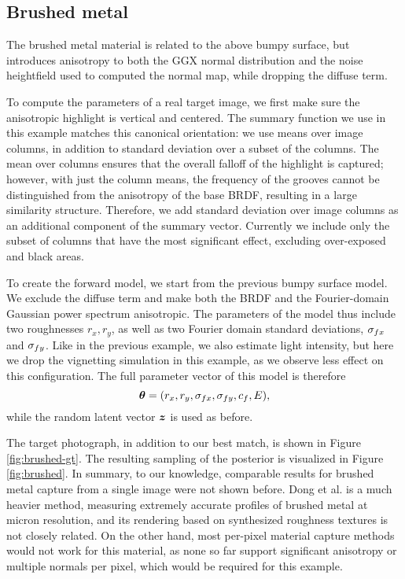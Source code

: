 \subsection{Brushed metal}

The brushed metal material is related to the above bumpy surface, but introduces anisotropy to both the GGX normal distribution and the noise heightfield used to computed the normal map, while dropping the diffuse term. %

To compute the parameters of a real target image, we first make sure the anisotropic highlight is vertical and centered. The summary function we use in this example matches this canonical orientation: we use means over image columns, in addition to standard deviation over a subset of the columns. The mean over columns ensures that the overall falloff of the highlight is captured; however, with just the column means, the frequency of the grooves cannot be distinguished from the anisotropy of the base BRDF, resulting in a large similarity structure. Therefore, we add standard deviation over image columns as an additional component of the summary vector. Currently we include only the subset of columns that have the most significant effect, excluding over-exposed and black areas.

To create the forward model, we start from the previous bumpy surface model. We exclude the diffuse term and make both the BRDF and the Fourier-domain Gaussian power spectrum anisotropic. The parameters of the model thus include two roughnesses $r_x,r_y$, as well as two Fourier domain standard deviations, $\sigma_{fx}$ and $\sigma_{fy}$. Like in the previous example, we also estimate light intensity, but here we drop the vignetting simulation in this example, as we observe less effect on this configuration. The full parameter vector of this model is therefore
\[
\bm{\theta} = (r_x, r_y, \sigma_{fx}, \sigma_{fy}, c_f, E),
\]
while the random latent vector $\bm{z}$ is used as before.

The target photograph, in addition to our best match, is shown in Figure \ref{fig:brushed-gt}. The resulting sampling of the posterior is visualized in Figure \ref{fig:brushed}. In summary, to our knowledge, comparable results for brushed metal capture from a single image were not shown before. Dong et al.  is a much heavier method, measuring extremely accurate profiles of brushed metal at micron resolution, and its rendering based on synthesized roughness textures is not closely related. On the other hand, most per-pixel material capture methods would not work for this material, as none so far support significant anisotropy or multiple normals per pixel, which would be required for this example.


